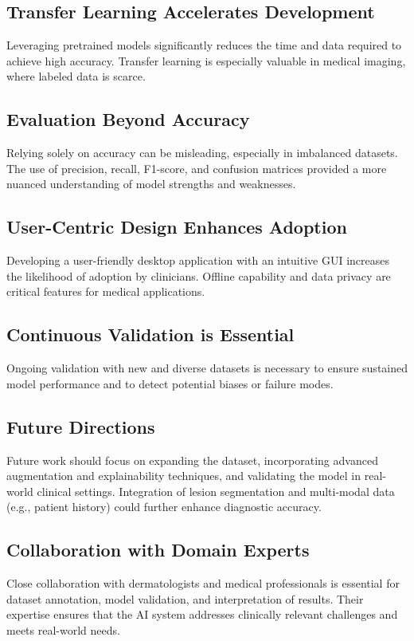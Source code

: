 \documentclass[a4paper,12pt]{report}
\begin{document}
\begin{spacing}{1.5}
        \subsection*{Transfer Learning Accelerates Development}
        Leveraging pretrained models significantly reduces the time and data required to achieve high accuracy. Transfer learning is especially valuable in medical imaging, where labeled data is scarce.
        
        \subsection*{Evaluation Beyond Accuracy}
        Relying solely on accuracy can be misleading, especially in imbalanced datasets. The use of precision, recall, F1-score, and confusion matrices provided a more nuanced understanding of model strengths and weaknesses.
        
        \subsection*{User-Centric Design Enhances Adoption}
        Developing a user-friendly desktop application with an intuitive GUI increases the likelihood of adoption by clinicians. Offline capability and data privacy are critical features for medical applications.
        
        \subsection*{Continuous Validation is Essential}
        Ongoing validation with new and diverse datasets is necessary to ensure sustained model performance and to detect potential biases or failure modes.
        
        \subsection*{Future Directions}
        Future work should focus on expanding the dataset, incorporating advanced augmentation and explainability techniques, and validating the model in real-world clinical settings. Integration of lesion segmentation and multi-modal data (e.g., patient history) could further enhance diagnostic accuracy.
        
        \subsection*{Collaboration with Domain Experts}
        Close collaboration with dermatologists and medical professionals is essential for dataset annotation, model validation, and interpretation of results. Their expertise ensures that the AI system addresses clinically relevant challenges and meets real-world needs.
        

\end{spacing}
\end{document}
